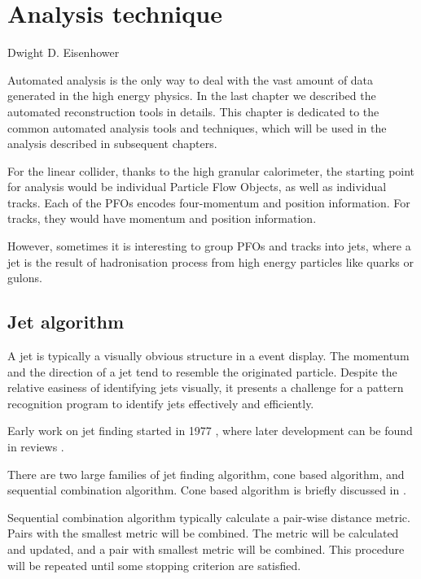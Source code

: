 \chapter{Analysis technique}
\label{chap:Reconstruction}

%
{Dwight D. Eisenhower}%

Automated analysis is the only way to deal with the vast amount of data generated in the high energy physics. In the last chapter we described the automated reconstruction tools in details. This chapter is dedicated to the common automated analysis tools and techniques, which will be used in the analysis described in subsequent chapters.

For the linear collider, thanks to the high granular calorimeter, the starting point for analysis would be individual Particle Flow Objects, as well as individual tracks. Each of the PFOs encodes four-momentum and position information. For tracks, they would have momentum and position information.

However, sometimes it is interesting to group PFOs and tracks into jets, where a jet is the result of hadronisation process from high energy particles like quarks or gulons.

\section{Jet algorithm}

A jet is typically a visually obvious structure in a event display. The momentum and the direction of a jet tend to resemble the originated particle. Despite the relative easiness of identifying jets visually, it presents a challenge for a pattern recognition program to identify jets effectively and efficiently.

Early work on jet finding started in 1977 \cite{PhysRevLett.39.1436}, where later development can be found in reviews \cite{Moretti:1998qx,Salam:2009jx,Ali:2010tw}.

There are two large families of jet finding algorithm, cone based algorithm, and sequential combination algorithm. Cone based algorithm is briefly discussed in .

Sequential combination algorithm typically calculate a pair-wise distance metric. Pairs with the smallest metric will be combined. The metric will be calculated and updated, and a pair with smallest metric will be combined. This procedure will be repeated until some stopping criterion are satisfied.


